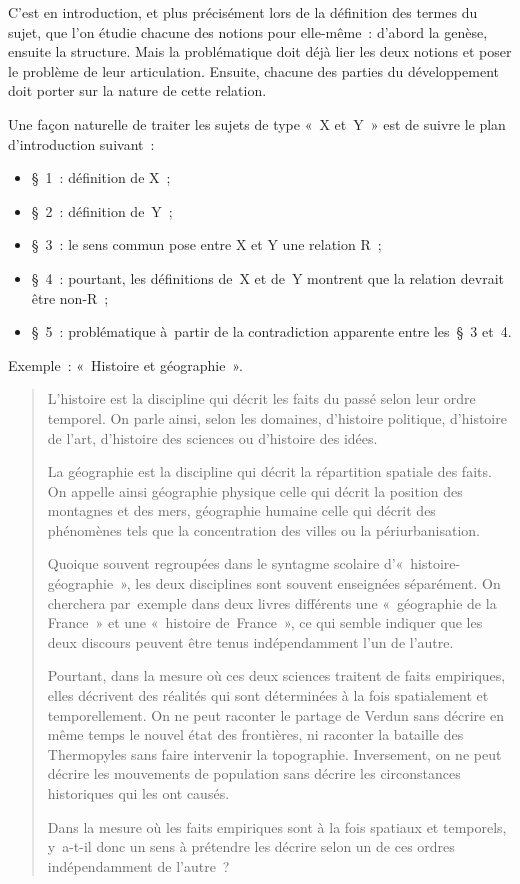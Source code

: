 \documentclass[a4paper,12pt]{report}
\begin{document}
C'est en introduction, et plus précisément lors de la définition des
termes du sujet, que l'on étudie chacune des notions pour elle-même :
d'abord la genèse, ensuite la structure. Mais la problématique doit déjà
lier les deux notions et poser le problème de leur articulation.
Ensuite, chacune des parties du développement doit porter sur la nature
de cette relation.

Une façon naturelle de traiter les sujets de type « X et Y » est de
suivre le plan d'introduction suivant :
\begin{itemize}
\item § 1 : définition de X ;
\item § 2 : définition de Y ;
\item § 3 : le sens commun pose entre X et Y une relation R ;
\item § 4 : pourtant, les définitions de X et de Y montrent que la relation
devrait être non-R ;
\item § 5 : problématique à partir de la contradiction apparente entre
les § 3 et 4.
\end{itemize}

Exemple : « Histoire et géographie ».
\begin{quotation}
L'histoire est la discipline qui décrit les faits
du passé selon leur ordre temporel. On parle ainsi, selon les domaines,
d'histoire politique, d'histoire de l'art, d'histoire des sciences ou
d'histoire des idées.

La géographie est la discipline qui décrit la répartition spatiale des
faits. On appelle ainsi géographie physique celle qui décrit la position
des montagnes et des mers, géographie humaine celle qui décrit des
phénomènes tels que la concentration des villes ou la périurbanisation.

Quoique souvent regroupées dans le syntagme
scolaire d'« his\-toire-géographie », les deux disciplines sont souvent
enseignées séparément. On cherchera par exemple dans deux livres
différents une « géographie de la France » et une « histoire
de France », ce qui semble indiquer que les deux discours peuvent être
tenus indépendamment l'un de l'autre.

Pourtant, dans la mesure où ces deux sciences
traitent de faits empiriques, elles décrivent des réalités qui sont
déterminées à la fois spatialement et temporellement. On ne peut
raconter le partage de Verdun sans décrire en même temps le nouvel état
des frontières, ni raconter la bataille des Thermopyles sans faire
intervenir la topographie. Inversement, on ne peut décrire les
mouvements de population sans décrire les circonstances historiques qui
les ont causés.

Dans la mesure où les faits empiriques sont à
la fois spatiaux et temporels, y a-t-il donc un sens à prétendre les
décrire selon un de ces ordres indépendamment de l'autre ?
\end{quotation}
\end{document}
